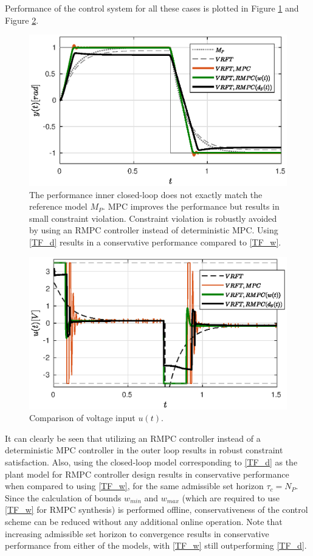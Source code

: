 \documentclass[letterpaper, 10 pt, conference]{ieeeconf}  %
\begin{document}
	Performance of the control system for all these cases is plotted in Figure \ref{VRFT_y} and Figure \ref{VRFT_u}.
	\begin{figure}[t]
		\hspace{20pt}
		\includegraphics[scale = 0.50]{VRFT_vs_MPC.eps}
		\caption{The performance inner closed-loop does not exactly match the reference model $M_P$. MPC improves the performance but results in small constraint violation. Constraint violation is robustly avoided by using an RMPC controller instead of deterministic MPC. Using \eqref{TF_d} results in a conservative performance compared to \eqref{TF_w}.  }
		\label{VRFT_y}
	\end{figure} 
	\begin{figure}[t]
		\hspace{20pt}
		\includegraphics[scale = 0.50]{VRFT_vs_MPC_u.eps}
		\caption{Comparison of voltage input $u(t)$.}
		\label{VRFT_u}
	\end{figure} 
	It can clearly be seen that utilizing an RMPC controller instead of a deterministic MPC controller in the outer loop results in robust constraint satisfaction. Also, using the closed-loop model corresponding to \eqref{TF_d} as the plant model for RMPC controller design results in conservative performance when compared to using \eqref{TF_w}, for the same admissible set horizon $\tau_c = N_P$. Since the calculation of bounds $w_{min}$ and $w_{max}$ (which are required to use \eqref{TF_w} for RMPC synthesis) is performed offline, conservativeness of the control scheme can be reduced without any additional online operation. Note that increasing admissible set horizon to convergence results in conservative performance from either of the models, with \eqref{TF_w} still outperforming \eqref{TF_d}. 
	
\end{document}
